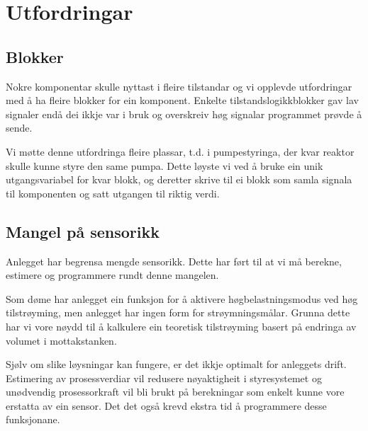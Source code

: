 \section{Utfordringar}
\thispagestyle{fancy}

\subsection{Blokker}
Nokre komponentar skulle nyttast i fleire tilstandar og vi opplevde 
utfordringar med å ha fleire blokker for ein komponent.
Enkelte tilstandslogikkblokker gav lav signaler endå dei ikkje var i bruk og 
overskreiv høg signalar programmet prøvde å sende.

Vi møtte denne utfordringa fleire plassar, t.d. i pumpestyringa,
der kvar reaktor skulle kunne styre den same pumpa.
Dette løyste vi ved å bruke ein unik utgangsvariabel for kvar blokk, 
og deretter skrive til ei blokk som samla signala til komponenten og satt utgangen til riktig verdi.

\subsection{Mangel på sensorikk}

Anlegget har begrensa mengde sensorikk. 
Dette har ført til at vi må berekne, estimere og programmere rundt denne mangelen.

Som døme har anlegget ein funksjon for å aktivere
høgbelastningsmodus ved høg tilstrøyming, 
men anlegget har ingen form for strøymningsmålar.\newline
Grunna dette har vi vore nøydd til å kalkulere ein teoretisk tilstrøyming basert på endringa av volumet i mottakstanken.

Sjølv om slike løysningar kan fungere, er det ikkje optimalt for anleggets drift.
Estimering av prosessverdiar vil redusere nøyaktigheit i styresystemet og
unødvendig prosessorkraft vil bli brukt på berekningar som enkelt kunne vore erstatta av ein sensor.\newline
Det det også krevd ekstra tid å programmere desse funksjonane.


